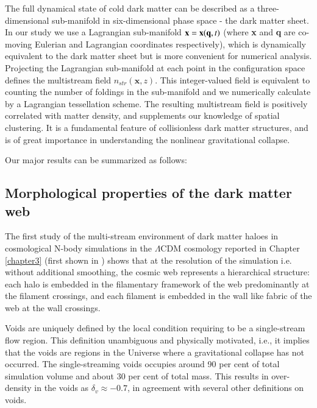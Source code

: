 The full dynamical state of cold dark matter can be described as a three-dimensional sub-manifold
in six-dimensional phase space - the dark matter sheet. In our study we use a Lagrangian sub-manifold ${\bf x} = {\bf x}({\bf q},t)$ 
(where {\bf x} and {\bf q} are co-moving Eulerian and Lagrangian coordinates respectively), which 
is dynamically equivalent to the dark matter sheet but is more convenient for numerical analysis. Projecting the Lagrangian sub-manifold at each point in the configuration space defines the multistream field  $n_{str}(\mathbf{x}, z)$. This integer-valued field is equivalent to counting the number of foldings in the sub-manifold and we numerically calculate by a Lagrangian tessellation scheme. The resulting multistream field is positively correlated with matter density, and supplements our knowledge of spatial clustering. It is a fundamental feature of collisionless dark matter structures, and is of great importance in understanding the nonlinear gravitational collapse.

Our major results can be summarized as follows:

\subsection{Morphological properties of the dark matter web}
The first study of the multi-stream environment of dark matter haloes in cosmological N-body simulations in the $\Lambda$CDM cosmology reported in Chapter \ref{chapter3} (first shown in \citealt{Ramachandra2015}) shows that at the resolution of the simulation i.e. without additional smoothing, the cosmic web represents a hierarchical structure: each halo is embedded in the filamentary framework of the web predominantly at the filament crossings, and each filament is embedded in the wall like fabric of the web at the wall crossings. 

Voids are uniquely defined by the local condition requiring to be a single-stream flow region. This definition unambiguous and physically motivated, i.e., it implies that the voids are regions in the Universe where a gravitational collapse has not occurred. The single-streaming voids occupies around 90 per cent of total simulation volume and about 30 per cent of total mass. This results in over-density in the voids as $\delta_{v} \approx -0.7$, in agreement with several other definitions on voids.  

